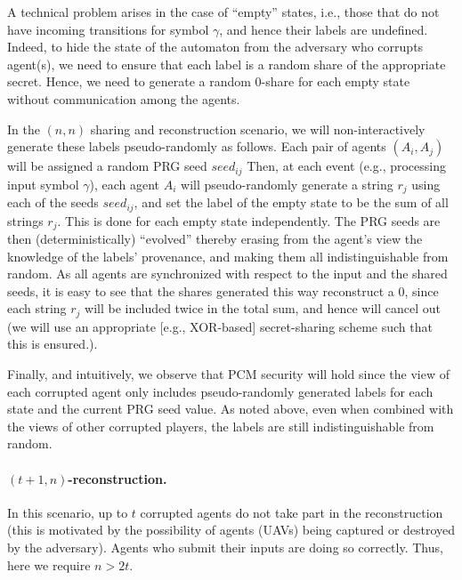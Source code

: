\documentclass[letterpaper,11pt]{article}
\newcommand{\seed}{\mathit{seed}}
\begin{document}
A technical problem arises in the case of ``empty'' states, i.e.,
those that do not have incoming transitions for symbol $\gamma$, and
hence their labels are undefined. Indeed, to hide the state of the
automaton from the adversary who corrupts agent(s), we need to ensure that
each label is a random share of the appropriate secret.  Hence, we
need to generate a random $0$-share for each empty state without
communication among the agents.








In the $(n,n)$ sharing and reconstruction scenario, we will non-interactively
generate these labels pseudo-randomly as follows.  Each pair of
agents $(A_i,A_j)$ will be assigned a random PRG seed $\seed_{ij}$ 
Then, at each event (e.g., processing input symbol
$\gamma$), each agent $A_i$ will pseudo-randomly generate a string
$r_j$ using each of the seeds $\seed_{ij}$, and set the label of the
empty state to be the sum of all strings $r_j$. 
This is done for each empty state independently.  The PRG
seeds are then (deterministically) ``evolved'' thereby erasing from the
agent's view the knowledge of the labels' provenance, and making them all
indistinguishable from random.  As all agents are synchronized with
respect to the input and the shared seeds, it is easy to see that the
shares generated this way reconstruct a $0$, since each string $r_j$ will be
included twice in the total sum, and hence will cancel out (we will use an
appropriate [e.g., XOR-based] secret-sharing scheme such that 
this is ensured.).


Finally, and intuitively, we observe that  PCM security
will hold since
the view of each corrupted agent only includes pseudo-randomly
generated labels for each state and the current PRG seed value.  As noted
above, even when combined with the views of other corrupted players, the labels
are still indistinguishable from random.

\vspace{-.1in}
\paragraph{$(t+1, n)$-reconstruction.} In this scenario, up to $t$ corrupted 
agents do not take part in the reconstruction (this is motivated by the
possibility of agents (UAVs) being captured or destroyed by the
adversary).  Agents who submit their inputs are doing so correctly.
Thus, here we require $n>2t$.
\end{document}
